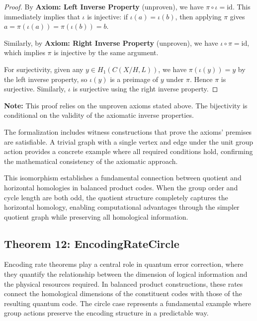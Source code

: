 \documentclass[11pt]{article}
\theoremstyle{plain}
\theoremstyle{definition}
\theoremstyle{remark}
\begin{document}
\begin{proof}
By \textbf{Axiom: Left Inverse Property} (unproven), we have $\pi \circ \iota = \mathrm{id}$. This immediately implies that $\iota$ is injective: if $\iota(a) = \iota(b)$, then applying $\pi$ gives $a = \pi(\iota(a)) = \pi(\iota(b)) = b$.

Similarly, by \textbf{Axiom: Right Inverse Property} (unproven), we have $\iota \circ \pi = \mathrm{id}$, which implies $\pi$ is injective by the same argument.

For surjectivity, given any $y \in H_1(C(X/H,L))$, we have $\pi(\iota(y)) = y$ by the left inverse property, so $\iota(y)$ is a preimage of $y$ under $\pi$. Hence $\pi$ is surjective. Similarly, $\iota$ is surjective using the right inverse property.
\end{proof}

\textbf{Note:} This proof relies on the unproven axioms stated above. The bijectivity is conditional on the validity of the axiomatic inverse properties.

The formalization includes witness constructions that prove the axioms' premises are satisfiable. A trivial graph with a single vertex and edge under the unit group action provides a concrete example where all required conditions hold, confirming the mathematical consistency of the axiomatic approach.

This isomorphism establishes a fundamental connection between quotient and horizontal homologies in balanced product codes. When the group order and cycle length are both odd, the quotient structure completely captures the horizontal homology, enabling computational advantages through the simpler quotient graph while preserving all homological information.

\vspace{1em}

\subsection{Theorem 12: EncodingRateCircle}

Encoding rate theorems play a central role in quantum error correction, where they quantify the relationship between the dimension of logical information and the physical resources required. In balanced product constructions, these rates connect the homological dimensions of the constituent codes with those of the resulting quantum code. The circle case represents a fundamental example where group actions preserve the encoding structure in a predictable way.
\end{document}
